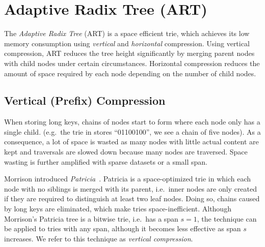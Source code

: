 \documentclass[abstracton,12pt]{scrartcl}
\theoremstyle{definition}
\begin{document}
\newpage

\section{Adaptive Radix Tree (ART)}\label{sec:art}

The \textit{Adaptive Radix Tree} (ART) is a space efficient trie, which
achieves its low memory consumption using \textit{vertical} and 
\textit{horizontal} compression. Using vertical compression, ART reduces
the tree height significantly by merging parent nodes with child nodes
under certain circumstances. Horizontal compression reduces the amount
of space required by each node depending on the number of child nodes.

\subsection{Vertical (Prefix) Compression}\label{sec:vertical-compression}

When storing long keys, chains of nodes start to form where each node only
has a single child. (e.g.\ the trie in  stores ``01100100'',
we see a chain of five nodes).
As a consequence, a lot of space is wasted as many nodes
with little actual content are kept and traversals are slowed down because
many nodes are traversed. Space wasting is further amplified with sparse
datasets or a small span.

Morrison introduced \textit{Patricia}~\cite{morrison1968patricia}. 
Patricia is a space-optimized trie in which
each node with no siblings is merged with its parent, i.e.\ inner nodes
are only created if they are required to distinguish at least two leaf nodes. 
Doing so, chains caused by long keys are eliminated, which make tries 
space-inefficient. Although Morrison's Patricia tree is a bitwise trie, i.e.\ 
has a span $s=1$, the technique can be applied to tries with any span,
although it becomes less effective as span $s$ increases.
We refer to this technique as \textit{vertical compression}.
\end{document}
